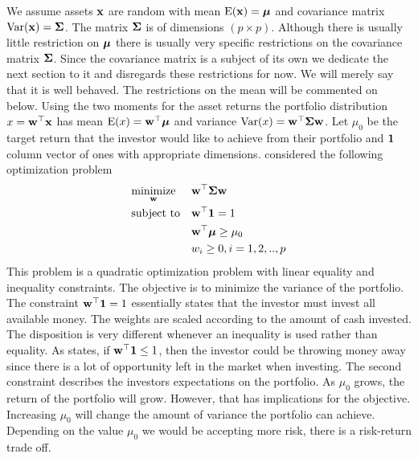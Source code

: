 \documentclass[oneside]{book}\usepackage{knitr}
\begin{document}
We assume assets $\mathbf{x}$ are random with mean $\operatorname{E}(\mathbf{x})=\mbox{\boldmath$\mu$}$ and covariance matrix $\operatorname{Var}(\mathbf{x})=\mathbf{\Sigma}$. The matrix $\mathbf{\Sigma}$ is of dimensions $(p \times p)$. Although there is usually little restriction on $\mbox{\boldmath$\mu$}$ there is usually very specific restrictions on the covariance matrix $\mathbf{\Sigma}$. Since the covariance matrix is a subject of its own we dedicate the next section to it and disregards these restrictions for now. We will merely say that it is well behaved. The restrictions on the mean will be commented on below. Using the two moments for the asset returns the portfolio distribution $x = \mathbf{w}^\top \mathbf{x}$ has mean $\operatorname{E}(x)=\mathbf{w}^\top \mbox{\boldmath$\mu$}$ and variance $\operatorname{Var}(x)=\mathbf{w}^\top \mathbf{\Sigma} \mathbf{w}$. Let $\mu_0$ be the target return that the investor would like to achieve from their portfolio and $\mathbf{1}$ column vector of ones with appropriate dimensions. \textcite{markowitz1959portfolio} considered the following optimization problem
\begin{equation}\label{eqn:markowitz_optim}
\begin{aligned}
& \underset{\mathbf{w}}{\text{minimize}} 
& & \mathbf{w}^\top \mathbf{\Sigma} \mathbf{w} \\
& \text{subject to}
& & \mathbf{w}^\top \mathbf{1} = 1 \\
& && \mathbf{w}^\top \mbox{\boldmath$\mu$} \geq \mu_0 \\
&&& w_i \geq 0, i=1,2,..,p
\end{aligned}
\end{equation}
This problem is a quadratic optimization problem with linear equality and inequality constraints. 
The objective is to minimize the variance of the portfolio. 
The constraint $\mathbf{w}^\top \mathbf{1} = 1$ essentially states that the investor must invest all available money. 
The weights are scaled according to the amount of cash invested.
The disposition is very different whenever an inequality is used rather than equality. 
As \textcite{hult2012risk} states, if $\mathbf{w}^\top \mathbf{1} \leq 1$, then the investor could be throwing money away since there is a lot of opportunity left in the market when investing.
The second constraint describes the investors expectations on the portfolio. 
As $\mu_0$ grows, the return of the portfolio will grow. 
However, that has implications for the objective. 
Increasing $\mu_0$ will change the amount of variance the portfolio can achieve. 
Depending on the value $\mu_0$ we would be accepting more risk, there is a risk-return trade off. 
\end{document}

